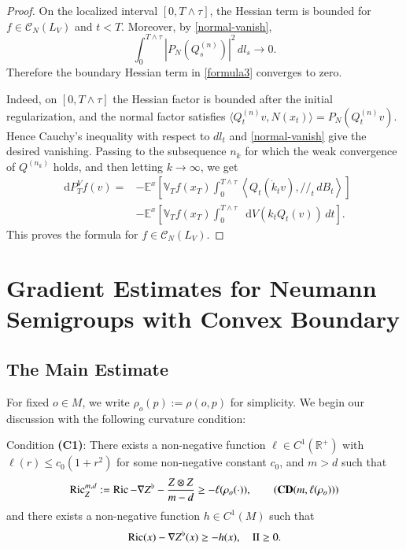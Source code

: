 \documentclass[11pt,twoside, reqno]{article}
\newcommand{\ed}{\mathop{}\!\mathrm{d}}
\def\mathpal#1{\mathop{\mathchoice{\text{\rm #1}}%
   {\text{\rm #1}}{\text{\rm #1}}%
   {\text{\rm #1}}}\nolimits}
\newcommand\Ric{\mathpal{Ric}}
\newcommand\1{\mathbbm{1}}
\newcommand\R{\mathbb{R}}
\newcommand\II{\mathrm{II}}
\theoremstyle{definition}
\numberwithin{equation}{section}
\begin{document}
\begin{proof}
On the localized interval $[0,T\wedge\tau]$, the Hessian term is bounded for
$f\in\mathcal C_N(L_V)$ and $t<T$. Moreover, by \eqref{normal-vanish},
\[
        \int_0^{T\wedge\tau}|P_N(Q_s^{(n)})|^2\,dl_s\to0.
\]
Therefore the boundary Hessian term in \eqref{formula3} converges to zero. 

Indeed, on \([0,T\wedge\tau]\) the Hessian factor is bounded after the
initial regularization, and the normal factor satisfies
\(\langle Q_t^{(n)}v,N(x_t)\rangle=P_N(Q_t^{(n)}v)\).  Hence Cauchy's
inequality with respect to \(dl_t\) and \eqref{normal-vanish} give the desired
vanishing.
Passing to the subsequence $n_k$ for which the weak convergence of
$Q^{(n_k)}$ holds, and then letting $k\to\infty$, we get
\[
\begin{aligned}
        \ed P_T^Vf(v)
        =&-\mathbb E^x\left[
        \mathbb V_Tf(x_T)
        \int_0^{T\wedge\tau}
        \left\langle Q_t(\dot k_tv),/\!/_t\,dB_t\right\rangle
        \right]
        \\
        &-\mathbb E^x\left[
        \mathbb V_Tf(x_T)
        \int_0^{T\wedge\tau}\ed V(k_tQ_t(v))\,dt
        \right].
\end{aligned}
\]
This proves the formula for  $f\in\mathcal C_N(L_V)$. \end{proof}




\section{Gradient Estimates for Neumann Semigroups with Convex Boundary}

\subsection{The Main Estimate}
For fixed $o\in M$, we write $\rho_o(p):=\rho(o, p)$ for simplicity.
We begin  our discussion  with the following curvature condition:

\begin{mdframed}  Condition {\bf (C1)}:  There exists a non-negative function $\ell \in C^1(\R^+)$ with $\ell(r)\leq c_0(1+r^2)$ for some non-negative constant $c_0$, and  $m>d$  such that
\begin{align}\label{CD-condition}
	\Ric_Z^{m,d}:=\Ric-\nabla Z^\flat-\frac{Z\otimes Z}{m-d}\geq -\ell (\rho_o(\cdot)),  \tag{{\bf CD}$(m, \ell(\rho_o))$}
\end{align}
and  there exists a non-negative function $h\in C^1(M)$ such that 
\begin{align}\label{c1}
\Ric(x)-\nabla Z^\flat(x)\geq -h(x),\quad \II\geq 0.
\end{align}
\end{mdframed}
 
\end{document}
